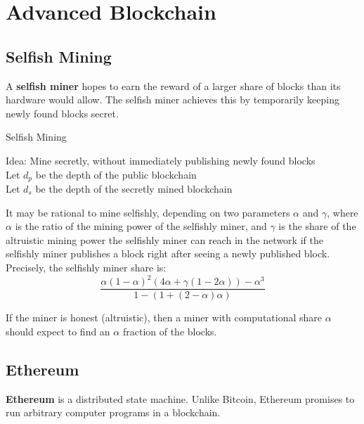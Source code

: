 \section{Advanced Blockchain}

\subsection{Selfish Mining}

A \textbf{selfish miner} hopes to earn the reward of a larger share of blocks than its hardware would allow. The selfish miner achieves this by temporarily keeping newly found blocks secret. \medskip

\begin{algorithm}[H]
\caption{Selfish Mining}
	Idea: Mine secretly, without immediately publishing newly found blocks\\
	Let $d_p$ be the depth of the public blockchain \\
	Let $d_s$ be the depth of the secretly mined blockchain\\
\end{algorithm}
\medskip

It may be rational to mine selfishly, depending on two parameters $\alpha$ and $\gamma$, where $\alpha$ is the ratio of the mining power of the selfishly miner, and $\gamma$ is the share of the altruistic mining power the selfishly miner can reach in the network if the selfishly miner publishes a block right after seeing a newly published block. Precisely, the selfishly miner share is:
$$\frac{\alpha(1-\alpha)^2(4\alpha + \gamma(1-2\alpha))-\alpha^3}{1 - (1 + (2- \alpha) \alpha)}$$

If the miner is honest (altruistic), then a miner with computational share $\alpha$ should expect to find an $\alpha$ fraction of the blocks.


\subsection{Ethereum}

\textbf{Ethereum} is a distributed state machine. Unlike Bitcoin, Ethereum promises to run arbitrary computer programs in a blockchain. \medskip

